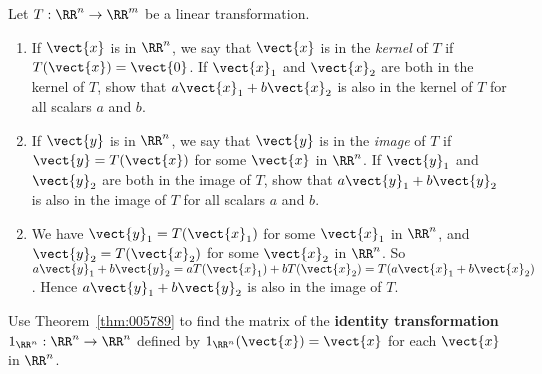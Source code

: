 \begin{multicols}{2}
\begin{ex}
\begin{sol}
\begin{enumerate}[label={\alph*.}]
\end{enumerate}
\end{sol}
\end{ex}

\begin{ex}
Let $T : \RR^n \to \RR^m$ be a linear transformation.

\begin{enumerate}[label={\alph*.}]
\item If $\vect{x}$ is in $\RR^n$, we say that $\vect{x}$ is in the \textit{kernel} of $T$ if $T(\vect{x}) = \vect{0}$. If $\vect{x}_{1}$ and $\vect{x}_{2}$ are both in the kernel of $T$, show that $a\vect{x}_{1} + b\vect{x}_{2}$ is also in the kernel of $T$ for all scalars $a$ and $b$.

\item If $\vect{y}$ is in $\RR^n$, we say that $\vect{y}$ is in the \textit{image} of $T$ if $\vect{y} = T(\vect{x})$ for some $\vect{x}$ in $\RR^n$. If $\vect{y}_{1}$ and $\vect{y}_{2}$ are both in the image of $T$, show that $a\vect{y}_{1} + b\vect{y}_{2}$ is also in the image of $T$ for all scalars $a$ and $b$.

\end{enumerate}
\begin{sol}
\begin{enumerate}[label={\alph*.}]
\setcounter{enumi}{1}
\item  We have $\vect{y}_{1} = T(\vect{x}_{1})$ for some $\vect{x}_{1}$ in $\RR^n$, and $\vect{y}_{2} = T(\vect{x}_{2})$ for some $\vect{x}_{2}$ in $\RR^n$. So $a\vect{y}_{1} + b\vect{y}_{2} = aT(\vect{x}_{1}) + bT(\vect{x}_{2}) = T(a\vect{x}_{1} + b\vect{x}_{2})$. Hence $a\vect{y}_{1} + b\vect{y}_{2}$ is also in the image of $T$.

\end{enumerate}
\end{sol}
\end{ex}

\begin{ex}
Use Theorem~\ref{thm:005789} to find the matrix of the \textbf{identity transformation} $1_{\RR^n} : \RR^n \to \RR^n$ defined by $1_{\RR^n}(\vect{x}) = \vect{x}$ for each $\vect{x}$ in $\RR^n$.
\end{ex}


\end{multicols}
